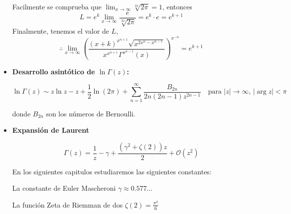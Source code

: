 \begin{itemize}
{	      Facilmente se comprueba que  $\lim_{x\to\infty} \sqrt[2x]{2\pi }=1$, entonces
	      $$
		      L= e^k\lim_{x \to \infty} \dfrac{e}{\sqrt[2x]{2\pi}  } =e^k\cdot e=e^{k+1}
	      $$
	      Finalmente, tenemos el valor de $L$,
	      $$
		      \therefore  \lim_{x \to \infty} \left(\dfrac{(x+k)^{x^{n+1}} \sqrt{x^{2x^n-x^{n-1}} }    }{x^{x^{n+1}} \Gamma^{x^{n-1}}(x) } \right) ^{x^{-n}}=e^{k+1}
	      $$
	      }

	\item \textbf{Desarrollo asintótico de \( \ln \Gamma(z) \):}

	      \[
		      \ln \Gamma(z) \sim z \ln z - z + \frac{1}{2} \ln(2\pi) + \sum_{n=1}^\infty \frac{B_{2n}}{2n(2n-1) z^{2n-1}}
		      \quad \text{para } |z| \to \infty,\, |\arg z| < \pi
	      \]

	      donde \( B_{2n} \) son los números de Bernoulli.

	\item \textbf{Expansión de Laurent}

	      $$
		      \Gamma(z)=\frac{1}{z}-\gamma +\frac{(\gamma^2+\zeta(2))z }{2}+\mathcal{O}(z^2)
	      $$

	      En los siguientes capitulos estudiaremos las siguientes constantes:

	      La constante de Euler Mascheroni $\gamma \approx 0.577 \ldots $

	      La función Zeta de Riemman de dos $\zeta(2)=\frac{\pi^2}{6}$

\end{itemize}

